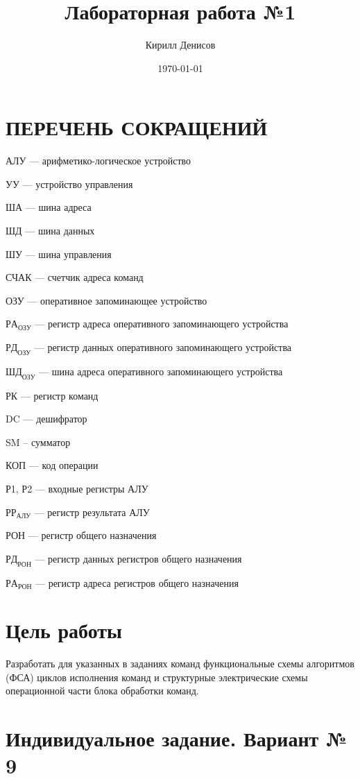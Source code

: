 \documentclass[a4paper,14pt]{extarticle}
\author{Кирилл Денисов}
\title{Лабораторная работа №1}
\date{\today}
\newcommand{\pathToCommonFolder}{/home/denilai/Documents/repos/latex/Common}
\def\myformat#1{\hfil #1\hfil}
\begin{document}
	\thispagestyle{empty}
	
	\newpage
	
	\section*{\myformat{ПЕРЕЧЕНЬ СОКРАЩЕНИЙ}}	
	АЛУ --- арифметико-логическое устройство
	
	УУ --- устройство управления
	
	ША --- шина адреса
	
	ШД --- шина данных
	
	ШУ --- шина управления
	
	СЧАК --- счетчик адреса команд
	
	ОЗУ  --- оперативное запоминающее устройство
	
	$РА_{ОЗУ}$ --- регистр адреса оперативного запоминающего устройства
	
	$РД_{ОЗУ}$ --- регистр данных оперативного запоминающего устройства
	
	$ШД_{ОЗУ}$ --- шина адреса оперативного запоминающего устройства
	
	РК  --- регистр команд
	
	
	DC  --- дешифратор
	
	SM -- сумматор
	
	КОП --- код операции
	
	Р1, Р2 --- входные регистры АЛУ
	
	$РР_{АЛУ}$ --- регистр результата АЛУ
	
	РОН --- регистр общего назначения
	
	
	$РД_{РОН}$  --- регистр данных регистров общего назначения
	
	$РА_{РОН}$  --- регистр адреса регистров общего назначения
	
	\newpage
	
\section*{Цель работы}
Разработать для указанных в заданиях команд функциональные схемы
алгоритмов
(ФСА)
циклов
исполнения
команд
и
структурные
электрические схемы операционной части блока обработки команд.
\section*{Индивидуальное задание. Вариант № 9}
\end{document}
